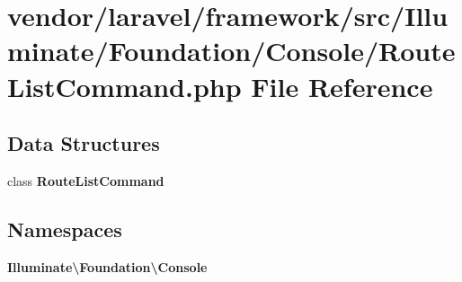 \section{vendor/laravel/framework/src/\+Illuminate/\+Foundation/\+Console/\+Route\+List\+Command.php File Reference}
\label{_route_list_command_8php}
\subsection*{Data Structures}
\begin{DoxyCompactItemize}
\item 
class {\bf Route\+List\+Command}
\end{DoxyCompactItemize}
\subsection*{Namespaces}
\begin{DoxyCompactItemize}
\item 
 {\bf Illuminate\textbackslash{}\+Foundation\textbackslash{}\+Console}
\end{DoxyCompactItemize}
